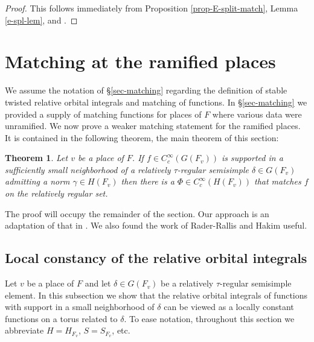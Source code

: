 \documentclass[12pt]{amsart}
\newtheorem{thm}{Theorem}[section]
\theoremstyle{remark}
\numberwithin{equation}{section}
\theoremstyle{definition}
\numberwithin{equation}{subsection}
\begin{document}
\begin{proof}This follows immediately from Proposition \ref{prop-E-split-match}, Lemma \ref{e-spl-lem}, \cite[Th\'eor\`eme 3.3.1]{Lab} and
\cite[Proposition 3.7.3]{Lab}.
\end{proof}

\section{Matching at the ramified places}
\label{sec-match-ram}
  We assume the notation of \S \ref{sec-matching} regarding the definition of stable twisted relative orbital integrals and matching of
  functions.  In \S \ref{sec-matching} we provided a supply of matching functions for places of $F$ where various data were unramified.  We now
  prove a weaker matching statement for the ramified places.    It is contained in the following theorem, the main theorem of this section:

\begin{thm} \label{thm-weak-match}   Let $v$ be a place of $F$.
If $f \in C_c^{\infty}(G(F_v))$ is supported in a sufficiently small neighborhood of a relatively $\tau$-regular semisimple $\delta \in G(F_v)$ admitting a norm $\gamma \in H(F_v)$
then there is a $\Phi \in C_c^{\infty}(H(F_v))$
 that matches $f$ on the relatively regular set.
\end{thm}
\noindent The proof will occupy the remainder of the section.  Our approach is an adaptation of that in \cite[\S 3.1]{Lab}.  We also found the work of Rader-Rallis \cite{RadRal} and Hakim \cite{HakimSCHP} useful.

\subsection{Local constancy of the relative orbital integrals} \label{ssec-loc-const}
Let $v$ be a place of $F$ and let $\delta \in G(F_v)$ be a relatively $\tau$-regular semisimple element.
In this subsection we show that the relative orbital integrals of functions with support in
a small neighborhood of $\delta$ can be viewed as a locally constant functions on a torus related to $\delta$.
To ease notation, throughout this section we abbreviate $H=H_{F_v}$, $S=S_{F_v}$, etc.
\end{document}
